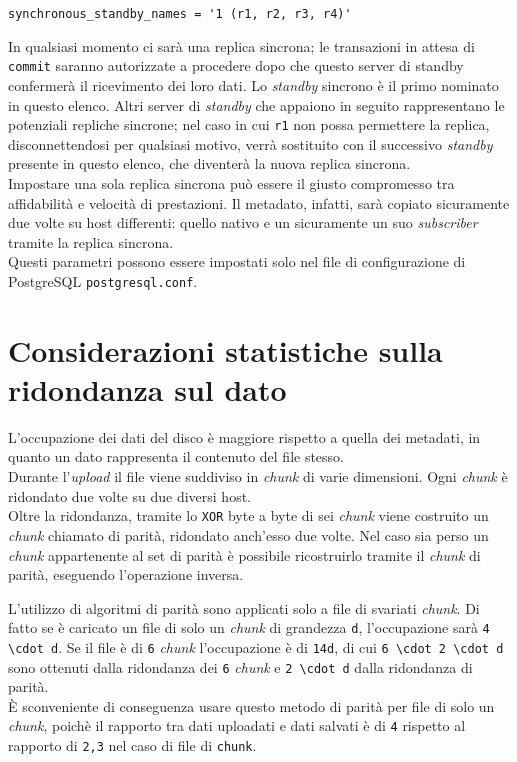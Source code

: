 \begin{center}

\verb"synchronous_standby_names = '1 (r1, r2, r3, r4)'"

\end{center}

In qualsiasi momento ci sar\`{a} una replica sincrona; le transazioni in attesa di \verb"commit" saranno autorizzate a procedere dopo che questo server di standby confermer\`{a} il ricevimento dei loro dati. 
Lo \textit{standby} sincrono \`{e} il primo nominato in questo elenco. Altri server di \textit{standby} che appaiono in seguito rappresentano le potenziali repliche sincrone; nel caso in cui \verb"r1" non possa permettere la replica, disconnettendosi per qualsiasi motivo, verr\`{a} sostituito con il successivo \textit{standby} presente in questo elenco, che diventer\`{a} la nuova replica sincrona. \\

Impostare una sola replica sincrona pu\`{o} essere il giusto compromesso tra affidabilit\`{a} e velocit\`{a} di prestazioni. Il metadato, infatti, sar\`{a} copiato sicuramente due volte su host differenti: quello nativo e un sicuramente un suo \textit{subscriber} tramite la replica sincrona.\\

Questi parametri possono essere impostati solo nel file di configurazione di PostgreSQL \verb"postgresql.conf".

\section{Considerazioni statistiche sulla ridondanza sul dato}
L'occupazione dei dati del disco \`{e} maggiore rispetto a quella dei metadati, in quanto un dato rappresenta il contenuto del file stesso.\\

Durante l'\textit{upload} il file viene suddiviso in \textit{chunk} di varie dimensioni. Ogni \textit{chunk} \`{e} ridondato due volte su due diversi host.\\
Oltre la ridondanza, tramite lo \verb"XOR" byte a byte di sei \textit{chunk} viene costruito un \textit{chunk} chiamato di parit\`{a}, ridondato anch'esso due volte. 
Nel caso sia perso un \textit{chunk} appartenente al set di parit\`{a} \`{e} possibile ricostruirlo tramite il \textit{chunk} di parit\`{a}, eseguendo l'operazione inversa.

L'utilizzo di algoritmi di parit\`{a} sono applicati solo a file di svariati \textit{chunk}. Di fatto se \`{e} caricato un file di solo un \textit{chunk} di grandezza \verb"d", l'occupazione sar\`{a} \verb"4 \cdot d". Se il file \`{e} di \verb"6" \textit{chunk} l'occupazione \`{e} di \verb"14d", di cui \verb"6 \cdot 2 \cdot d" sono ottenuti dalla ridondanza dei \verb"6" \textit{chunk} e \verb"2 \cdot d" dalla ridondanza di parit\`{a}.\\
\`{E} sconveniente di conseguenza usare questo metodo di parit\`{a} per file di solo un \textit{chunk}, poich\`{e} il rapporto tra dati uploadati e dati salvati \`{e} di \verb"4" rispetto al rapporto di \verb"2,3" nel caso di file di \verb"chunk".\\

